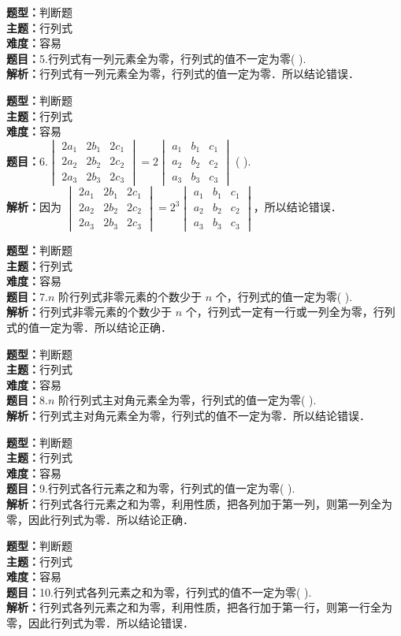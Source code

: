 \documentclass{ctexart}
\newenvironment{question}[5]{%
	\noindent\textbf{题型：}#1\\
	\textbf{主题：}#2\\
	\textbf{难度：}#3\\
	\textbf{题目：}#4\\
	\textbf{解析：}#5\\
	\vspace{1em}
}{}
\begin{document}
	\begin{question}
		{判断题}
		{行列式}
		{容易}
		{5.行列式有一列元素全为零，行列式的值不一定为零(  ).}
		{行列式有一列元素全为零，行列式的值一定为零．所以结论错误．}
	\end{question}
	
	\begin{question}
		{判断题}
		{行列式}
		{容易}
		{6.$\begin{vmatrix}2 a_1 & 2 b_1 & 2 c_1 \\ 2 a_2 & 2 b_2 & 2 c_2 \\ 2 a_3 & 2 b_3 & 2 c_3\end{vmatrix}=2\begin{vmatrix}a_1 & b_1 & c_1 \\ a_2 & b_2 & c_2 \\ a_3 & b_3 & c_3\end{vmatrix}$ (  ).}
		{因为 $\begin{vmatrix}2 a_1 & 2 b_1 & 2 c_1 \\ 2 a_2 & 2 b_2 & 2 c_2 \\ 2 a_3 & 2 b_3 & 2 c_3\end{vmatrix}=2^3\begin{vmatrix}a_1 & b_1 & c_1 \\ a_2 & b_2 & c_2 \\ a_3 & b_3 & c_3\end{vmatrix}$，所以结论错误．}
	\end{question}
	
	\begin{question}
		{判断题}
		{行列式}
		{容易}
		{7.$n$ 阶行列式非零元素的个数少于 $n$ 个，行列式的值一定为零(  ).}
		{行列式非零元素的个数少于 $n$ 个，行列式一定有一行或一列全为零，行列式的值一定为零．所以结论正确．}
	\end{question}
	
	\begin{question}
		{判断题}
		{行列式}
		{容易}
		{8.$n$ 阶行列式主对角元素全为零，行列式的值一定为零(  ).}
		{行列式主对角元素全为零，行列式的值不一定为零．所以结论错误．}
	\end{question}
	
	\begin{question}
		{判断题}
		{行列式}
		{容易}
		{9.行列式各行元素之和为零，行列式的值一定为零(  ).}
		{行列式各行元素之和为零，利用性质，把各列加于第一列，则第一列全为零，因此行列式为零．所以结论正确．}
	\end{question}
	
	\begin{question}
		{判断题}
		{行列式}
		{容易}
		{10.行列式各列元素之和为零，行列式的值不一定为零(  ).}
		{行列式各列元素之和为零，利用性质，把各行加于第一行，则第一行全为零，因此行列式为零．所以结论错误．}
	\end{question}
	
\end{document}
